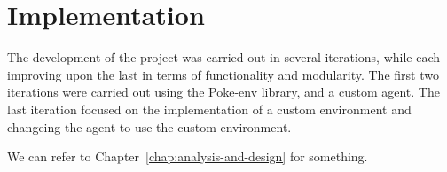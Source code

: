 \chapter{Implementation}
\label{chap:implementation}

The development of the project was carried out in several iterations, while each 
improving upon the last in terms of functionality and modularity.
The first two iterations were carried out using the Poke-env library, and a 
custom agent. The last iteration focused on the implementation of a custom 
environment and changeing the agent to use the custom environment.


We can refer to Chapter~\ref{chap:analysis-and-design} for something.








